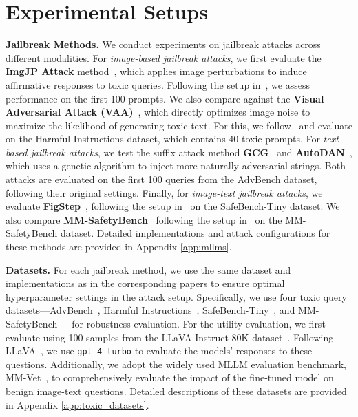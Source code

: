 
\section{Experimental Setups}\label{sec:exp_setup}



\textbf{Jailbreak Methods.}
We conduct experiments on jailbreak attacks across different modalities.
For \textit{image-based jailbreak attacks}, we first evaluate the \textbf{ImgJP Attack} method~\citep{niu2024jailbreaking}, which applies image perturbations to induce affirmative responses to toxic queries. Following the setup in~\citep{niu2024jailbreaking}, we assess performance on the first 100 prompts. We also compare against the \textbf{Visual Adversarial Attack (VAA)}~\citep{qi2024visual}, which directly optimizes image noise to maximize the likelihood of generating toxic text. For this, we follow~\citep{qi2024visual} and evaluate on the Harmful Instructions dataset, which contains 40 toxic prompts.
For \textit{text-based jailbreak attacks}, we test the suffix attack method \textbf{GCG}~\citep{zou2023universal} and \textbf{AutoDAN}~\citep{liuautodan}, which uses a genetic algorithm to inject more naturally adversarial strings. Both attacks are evaluated on the first 100 queries from the AdvBench dataset, following their original settings.
Finally, for \textit{image-text jailbreak attacks}, we evaluate \textbf{FigStep}~\citep{gong2023figstep}, following the setup in~\citep{gong2023figstep} on the SafeBench-Tiny dataset. We also compare \textbf{MM-SafetyBench}~\citep{liu2023mm} following the setup in~\citep{liu2023mm} on the MM-SafetyBench dataset.
Detailed implementations and attack configurations for these methods are provided in Appendix \textcolor{red}{\ref{app:mllms}}.

\textbf{Datasets.} For each jailbreak method, we use the same dataset and implementations as in the corresponding papers to ensure optimal hyperparameter settings in the attack setup. Specifically, we use four toxic query datasets—AdvBench~\citep{zou2023universal}, Harmful Instructions~\citep{qi2024visual}, SafeBench-Tiny~\citep{gong2023figstep}, and MM-SafetyBench~\citep{liu2023mm}—for robustness evaluation.
For the utility evaluation, we first evaluate using 100 samples from the LLaVA-Instruct-80K dataset~\citep{li2023llava}. Following LLaVA~\citep{li2023llava}, we use \texttt{gpt-4-turbo} to evaluate the models' responses to these questions. Additionally, we adopt the widely used MLLM evaluation benchmark, MM-Vet~\citep{mmvet}, to comprehensively evaluate the impact of the fine-tuned model on benign image-text questions.
Detailed descriptions of these datasets are provided in Appendix \textcolor{red}{\ref{app:toxic_datasets}}.



